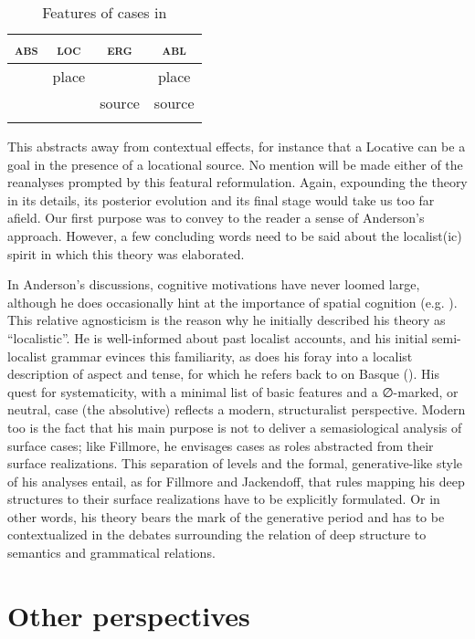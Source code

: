 \documentclass[english,output=paper,colorlinks,citecolor=brown]{../langscibook}
\begin{document}
\begin{table}
\begin{tabular}{cccc}
\lsptoprule
\textsc{abs} & \textsc{loc} & \textsc{erg} & \textsc{abl}\\\midrule
& place & & place\\
& &  source & source \\
\lspbottomrule
\end{tabular}
\caption{Features of cases in \citet{Anderson1977}} 
\end{table}

This abstracts away from contextual effects, for instance that a Locative can be a goal in the presence of a locational source. No mention will be made either of the reanalyses prompted by this featural reformulation. Again, expounding the theory in its details, its posterior evolution and its final stage would take us too far afield. Our first purpose was to convey to the reader a sense of Anderson’s approach. However, a few concluding words need to be said about the localist(ic) spirit in which this theory was elaborated.

In Anderson’s discussions, cognitive motivations have never loomed large, although he does occasionally hint at the importance of spatial cognition (e.g. \citealt{Anderson1994}). This relative agnosticism is the reason why he initially described his theory as “localistic”. He is well-informed about past localist accounts, and his initial semi-localist grammar evinces this familiarity, as does his foray into a localist description of aspect and tense, for which he refers back to \citet{Darrigol1827} on Basque (\citealt{Anderson1973}). His quest for systematicity, with a minimal list of basic features and a ∅-marked, or neutral, case (the absolutive) reflects a modern, structuralist perspective. Modern too is the fact that his main purpose is not to deliver a semasiological analysis of surface cases; like Fillmore, he envisages cases as roles abstracted from their surface realizations. This separation of levels and the formal, generative-like style of his analyses entail, as for Fillmore and Jackendoff, that rules mapping his deep structures to their surface realizations have to be explicitly formulated. Or in other words, his theory bears the mark of the generative period and has to be contextualized in the debates surrounding the relation of deep structure to semantics and grammatical relations.

\section{Other perspectives}
\end{document}
